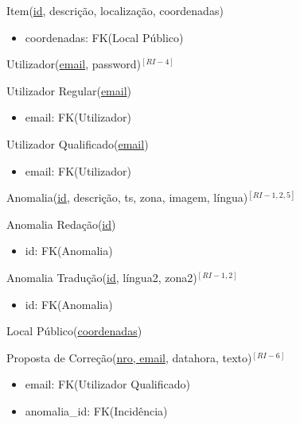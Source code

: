 \documentclass[12pt]{report}
\begin{document}
\begin{multicols}{2}
Item(\underline{id}, descrição, localização, coordenadas)
    \begin{itemize}
    \item coordenadas: FK(Local Público)
    \end{itemize}

\vspace{5mm}

Utilizador(\underline{email}, password)$^{[RI-4]}$

\vspace{5mm}

Utilizador Regular(\underline{email})
    \begin{itemize}
    \item email: FK(Utilizador)
    \end{itemize}


Utilizador Qualificado(\underline{email})
    \begin{itemize}
    \item email: FK(Utilizador)
    \end{itemize}

\vspace{5mm}



Anomalia(\underline{id}, descrição, ts, zona, imagem, língua)$^{[RI-1,2,5]}$


Anomalia Redação(\underline{id})
    \begin{itemize}
    \item id: FK(Anomalia)
    \end{itemize}


Anomalia Tradução(\underline{id}, língua2, zona2)$^{[RI-1,2]}$
    \begin{itemize}
    \item id: FK(Anomalia)
    \end{itemize}


\vspace{5mm}


Local Público(\underline{coordenadas})

\vspace{5mm}

Proposta de Correção(\underline{nro, email}, datahora, texto)$^{[RI-6]}$
    \begin{itemize}
	    \item email: FK(Utilizador Qualificado)
	    \item anomalia\_id: FK(Incidência)
    \end{itemize}




\end{multicols}
\end{document}
